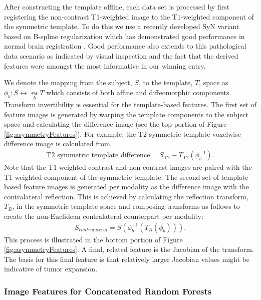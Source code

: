 \documentclass[preprint,authoryear,review,12pt]{elsarticle}
\begin{document}
After constructing the template offline, each data set is processed
by first registering the non-contrast T1-weighted image to the T1-weighted
component of the symmetric template.  To do this we use a recently developed 
SyN \citep{avants2011a} variant based on B-spline regularization 
which has demonstrated good performance in normal brain registration \citep{tustison2013a}.
Good performance also extends to this pathological data scenario as 
indicated by visual inspection and the fact that the derived features
were amongst the most informative in our winning entry.

We denote the mapping from the subject, $S$, to the template, $T$,
space as $\phi_b: S \leftrightarrow \underset{b}{\leftrightsquigarrow}  T$
which consists of both affine and diffeomorphic components.  Transform
invertibility is essential for the template-based features.  The first 
set of feature images is generated by warping the template components 
to the subject space and calculating the difference image (see the 
top portion of Figure \ref{fig:asymmetryFeatures}).  For example,
the T2 symmetric template voxelwise difference image is calculated from
\begin{align}
  \mathrm{T2}\,\,\mathrm{symmetric}\,\,\mathrm{template}\,\,\mathrm{difference} = S_{\mathrm{T2}} - T_{\mathrm{T2}}\left(\phi_b^{-1}\right).
\end{align}
Note that the T1-weighted contrast and non-contrast images are paired with
the T1-weighted component of the symmetric template.  The second
set of template-based feature images is generated per modality 
as the difference image with the contralateral reflection.  This is achieved by calculating the 
reflection transform, $T_R$, in the symmetric template space and composing transforms
as follows to create the non-Euclidean contralateral counterpart per modality:
\begin{align}
  S_{contralateral} = S\left( \phi_b^{-1}\left( T_R\left( \phi_b \right)\right)\right).
\end{align}
This process is illustrated in the bottom portion of Figure \ref{fig:asymmetryFeatures}. A final, related feature is the Jacobian
of the transform.  The basis for this final feature is that 
relatively larger Jacobian values might be indicative of tumor
expansion.


\subsubsection{Image Features for Concatenated Random Forests}
\end{document}
